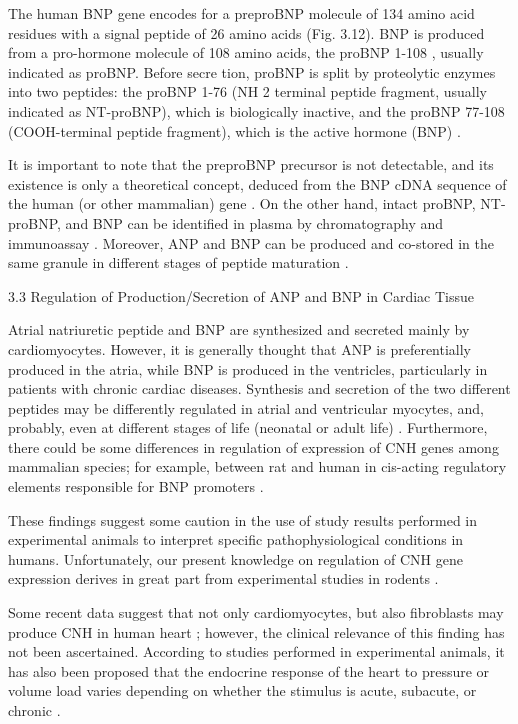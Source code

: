 \documentclass[14pt,a4paper,onecolumn]{extarticle}
\begin{document}
The human BNP gene encodes for a preproBNP molecule of 134 amino acid residues with a signal peptide of 26 amino acids (Fig. 3.12). BNP is produced from a pro-hormone molecule of 108 amino acids, the proBNP 1-108 , usually indicated as proBNP. Before secre tion, proBNP is split by proteolytic enzymes into two peptides: the proBNP 1-76 (NH 2 terminal peptide fragment, usually indicated as NT-proBNP), which is biologically inactive, and the proBNP 77-108 (COOH-terminal peptide fragment), which is the active hormone (BNP) \citep{14}.

It is important to note that the preproBNP precursor is not detectable, and its existence is only a theoretical concept, deduced from the BNP cDNA sequence of the human (or other mammalian) gene \citep{14}. On the other hand, intact proBNP, NT-proBNP, and BNP can be identified in plasma by chromatography and immunoassay \citep{14} \citep{15} \citep{16} \citep{17}. Moreover, ANP and BNP can be produced and co-stored in the same granule in different stages of peptide maturation \citep{11} \citep{12} \citep{13}.

3.3 Regulation of Production/Secretion of ANP and BNP in Cardiac Tissue

Atrial natriuretic peptide and BNP are synthesized and secreted mainly by cardiomyocytes. However, it is generally thought that ANP is preferentially produced in the atria, while BNP is produced in the ventricles, particularly in patients with chronic cardiac diseases. Synthesis and secretion of the two different peptides may be differently regulated in atrial and ventricular myocytes, and, probably, even at different stages of life (neonatal or adult life) \citep{12} \citep{13} \citep{14} \citep{18} \citep{19} \citep{20} \citep{21} \citep{22} \citep{23}. Furthermore, there could be some differences in regulation of expression of CNH genes among mammalian species; for example, between rat and human in cis-acting regulatory elements responsible for BNP promoters \citep{22}.

These findings suggest some caution in the use of study results performed in experimental animals to interpret specific pathophysiological conditions in humans. Unfortunately, our present knowledge on regulation of CNH gene expression derives in great part from experimental studies in rodents \citep{18} \citep{19} \citep{20} \citep{21} \citep{22} \citep{23}.

Some recent data suggest that not only cardiomyocytes, but also fibroblasts may produce CNH in human heart \citep{24}; however, the clinical relevance of this finding has not been ascertained. According to studies performed in experimental animals, it has also been proposed that the endocrine response of the heart to pressure or volume load varies depending on whether the stimulus is acute, subacute, or chronic \citep{12} \citep{13} \citep{18} \citep{22}.
\end{document}
